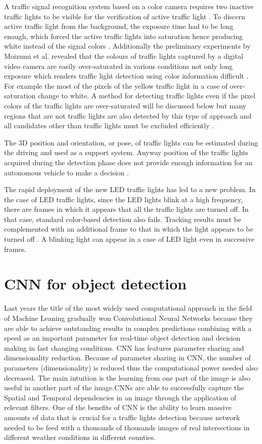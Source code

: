 \documentclass[letterpaper, 10 pt, conference]{ieeeconf} %
\begin{document}
A traffic signal recognition system based on a color camera requires two inactive traffic lights to be visible for the verification of active traffic light \cite{c6}. To discern active traffic light from the background, the exposure time had to be long enough, which forced the active traffic lights into saturation hence producing white instead of the signal colors \cite{c6}. Additionally the preliminary experiments by Moizumi et al. revealed that the colours of traffic lights captured by a digital video camera are easily over-saturated in various conditions not only long exposure which renders traffic light detection using color information difficult \cite{c3}. For example the most of the pixels of the yellow traffic light in a case of over-saturation change to white. A method for detecting traffic lights even if the pixel colors of the traffic lights are over-saturated will be discussed below but many regions that are not traffic lights are also detected by this type of approach and all candidates other than traffic lights must be excluded efficiently \cite{c3}.

The 3D position and orientation, or pose, of traffic lights can be estimated during the driving and used as a support system. Anyway position of the traffic lights acquired during the detection phase does not provide enough information for an autonomous vehicle to make a decision \cite{c7}.

The rapid deployment of the new LED traffic lights has led to a new problem. In the case of LED traffic lights, since the LED lights blink at a high frequency, there are frames in which it appears that all the traffic lights are turned off. In that case, standard color-based detection also fails. Tracking results must be complemented with an additional frame to that in which the light appears to be turned off \cite{c3}. A blinking light can appear in a case of LED light even in successive frames.


\section{CNN for object detection}
Last years the title of the most widely used computational approach in the field of Machine Leaning gradually won Convolutional Neural Networks because they are able to achieve outstanding results in complex predictions combining with a speed as an important parameter for real-time object detection and decision making in fast changing conditions. CNN has features parameter sharing and dimensionality reduction. Because of parameter sharing in CNN, the number of parameters (dimensionality) is reduced thus the computational power needed also decreased. The main intuition is the learning from one part of the image is also useful in another part of the image.CNNs are able to successfully capture the Spatial and Temporal dependencies in an image through the application of relevant filters. One of the benefits of CNN is the ability to learn massive amounts of data that is crucial for a traffic lights detection because network needed to be feed with a thousands of thousands images of real intersections in different weather conditions in different counties.
\end{document}
